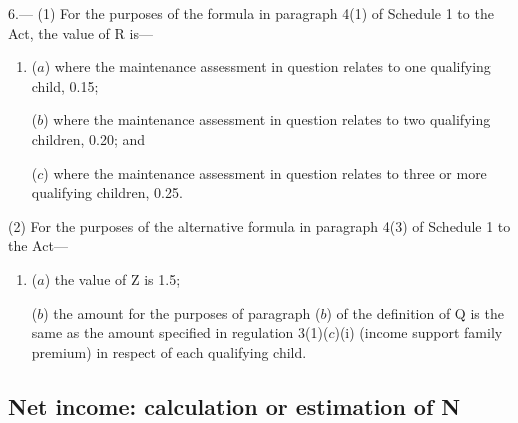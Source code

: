 \documentclass[12pt,a4paper]{article}
\begin{document}
6.—%
(1) For the purposes of the formula in paragraph 4(1) of Schedule 1 to the Act, the value of R is—
\begin{enumerate}\item[]
($a$) where the maintenance assessment in question relates to one qualifying child, 0.15;

($b$) where the maintenance assessment in question relates to two qualifying children, 0.20; and

($c$) where the maintenance assessment in question relates to three or more qualifying children, 0.25.
\end{enumerate}%

(2) For the purposes of the alternative formula in paragraph 4(3) of Schedule 1 to the Act—
\begin{enumerate}\item[]
($a$) the value of Z is 
1.5;  %

($b$) the amount for the purposes of paragraph ($b$) of the definition of Q is the same as the amount specified in 
regulation 3(1)($c$)(i)  %
(income support family premium) in respect of each qualifying child.
\end{enumerate}


\subsection[7. Net income: calculation or estimation of N]{Net income: calculation or estimation of N}
\end{document}
